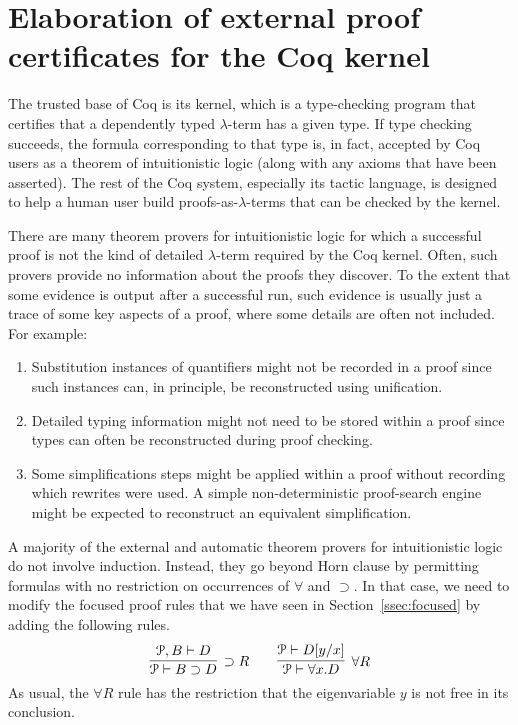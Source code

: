 \section{Elaboration of external proof certificates for the Coq kernel}
\label{sec:elab}

The trusted base of Coq is its kernel, which is a type-checking
program that certifies that a dependently typed $\lambda$-term has a
given type.  If type checking succeeds, the formula corresponding to
that type is, in fact, accepted by Coq users as a theorem of
intuitionistic logic (along with any axioms that have been asserted).
The rest of the Coq system, especially its tactic language, is
designed to help a human user build proofs-as-$\lambda$-terms that can
be checked by the kernel.

There are many theorem provers for intuitionistic logic
\cite{raths07jar} for which a successful proof is not the kind of
detailed $\lambda$-term required by the Coq kernel.  Often, such
provers provide no information about the proofs they discover.  To the
extent that some  evidence is output after a successful run, such
evidence is usually just a trace of some key aspects of a proof, where some
details are often not included.  For example:
\begin{enumerate}

\item Substitution instances of quantifiers might not be recorded in a
  proof since such instances can, in principle, be reconstructed using
  unification.

\item Detailed typing information might not need to be stored within a
  proof since types can often be reconstructed during proof checking.

\item Some simplifications steps might be applied within a proof
  without recording which rewrites were used.  A simple 
  non-deterministic proof-search engine might be expected to
  reconstruct an equivalent simplification.
\end{enumerate}
A majority of the external and automatic theorem provers for
intuitionistic logic do not involve induction.  Instead, they go
beyond Horn clause by permitting formulas with no restriction on
occurrences of $\forall$ and $\supset$.  In that case, we need to
modify the focused proof rules that we have seen in
Section~\ref{ssec:focused} by adding the following rules.
\[
  \infer[\supset R]{\Pscr\vdash B\supset D}{\Pscr, B\vdash D}
  \qquad
  \infer[\forall R]{\Pscr\vdash \forall x.D}{\Pscr\vdash D[y/x]}
\]
As usual, the $\forall R$ rule has the restriction that the
eigenvariable $y$ is not free in its conclusion.

